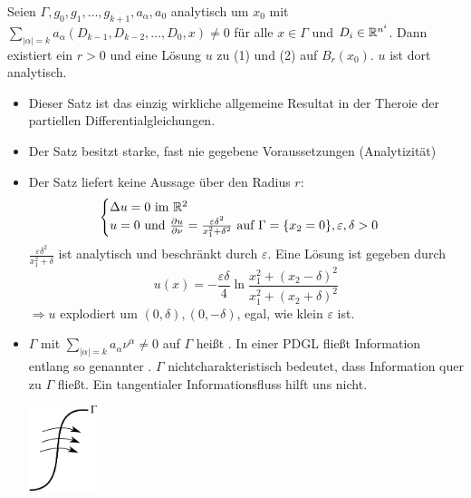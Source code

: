 \begin{thm} \label{sub:satz_cauchy_kova}
	Seien $\Gamma, g_0,g_1,\dots,g_{k+1},a_\alpha, a_0$ analytisch um $x_0$ mit $\sum\limits_{|\alpha| = k} a_\alpha (D_{k-1},D_{k-2}, \dots,D_0,x) \neq 0$ für alle $x \in \Gamma$ und $D_i \in \mathbb{R}^{n^i}$. Dann existiert ein $r > 0$ und eine Lösung $u$ zu (1) und (2) auf $B_r(x_0)$. $u$ ist dort analytisch. 
\end{thm}

\begin{bem}[Bemerkung]
	\begin{itemize}
		\item Dieser Satz ist das einzig wirkliche allgemeine Resultat in der Theroie der partiellen Differentialgleichungen. 
		\item Der Satz besitzt starke, fast nie gegebene Voraussetzungen (Analytizität)
		\item Der Satz liefert keine Aussage über den Radius $r$: %
			\[ \begin{cases}
				\Delta u = 0 \text{ im } \mathbb{R}^2 \\
				u = 0 \text{ und } \frac{\partial u}{\partial \nu} = \frac{\varepsilon \delta^2}{x_1^2 + \delta^2} \text{ auf } \Gamma = \{x_2 = 0 \}, \varepsilon,\delta > 0 \end{cases} \]
			$\frac{\varepsilon \delta^2}{x_1^2+\delta}$ ist analytisch und beschränkt durch $\varepsilon$. Eine Lösung ist gegeben durch
			\[ u(x) = -\frac{\varepsilon \delta}{4} \ln \frac{x_1^2 + (x_2 - \delta)^2}{x_1^2+(x_2 + \delta)^2}\]
			$\Rightarrow u$ explodiert um $(0,\delta),(0,-\delta)$, egal, wie klein $\varepsilon$ ist.
		\item \begin{minipage}[t]{11cm}
		$\Gamma$ mit $\sum\limits_{|\alpha| = k} a_\alpha \nu^\alpha \neq 0$ auf $\Gamma$ heißt . In einer PDGL fließt Information entlang so genannter . $\Gamma$ nichtcharakteristisch bedeutet, dass Information quer zu $\Gamma$ fließt. Ein tangentialer Informationsfluss hilft uns nicht. 
		\end{minipage} \hfill
		\begin{minipage}[t][2cm][b]{2.5cm}
		\includegraphics[keepaspectratio,width=2cm]{img/2_charkurv.pdf}

\end{minipage}
\end{itemize}
\end{bem}
